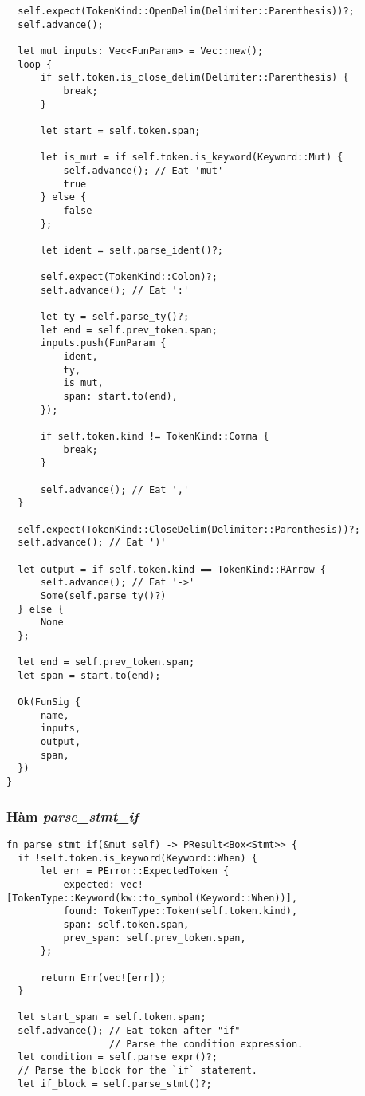 {\begin{lstlisting}
  self.expect(TokenKind::OpenDelim(Delimiter::Parenthesis))?;
  self.advance();

  let mut inputs: Vec<FunParam> = Vec::new();
  loop {
      if self.token.is_close_delim(Delimiter::Parenthesis) {
          break;
      }

      let start = self.token.span;

      let is_mut = if self.token.is_keyword(Keyword::Mut) {
          self.advance(); // Eat 'mut'
          true
      } else {
          false
      };

      let ident = self.parse_ident()?;

      self.expect(TokenKind::Colon)?;
      self.advance(); // Eat ':'

      let ty = self.parse_ty()?;
      let end = self.prev_token.span;
      inputs.push(FunParam {
          ident,
          ty,
          is_mut,
          span: start.to(end),
      });

      if self.token.kind != TokenKind::Comma {
          break;
      }

      self.advance(); // Eat ','
  }

  self.expect(TokenKind::CloseDelim(Delimiter::Parenthesis))?;
  self.advance(); // Eat ')'

  let output = if self.token.kind == TokenKind::RArrow {
      self.advance(); // Eat '->'
      Some(self.parse_ty()?)
  } else {
      None
  };

  let end = self.prev_token.span;
  let span = start.to(end);

  Ok(FunSig {
      name,
      inputs,
      output,
      span,
  })
}
\end{lstlisting}

\subsubsection{Hàm \textit{parse\_stmt\_if}}
\label{ap1:stmt_when}
\begin{lstlisting}
fn parse_stmt_if(&mut self) -> PResult<Box<Stmt>> {
  if !self.token.is_keyword(Keyword::When) {
      let err = PError::ExpectedToken {
          expected: vec![TokenType::Keyword(kw::to_symbol(Keyword::When))],
          found: TokenType::Token(self.token.kind),
          span: self.token.span,
          prev_span: self.prev_token.span,
      };

      return Err(vec![err]);
  }

  let start_span = self.token.span;
  self.advance(); // Eat token after "if"
                  // Parse the condition expression.
  let condition = self.parse_expr()?;
  // Parse the block for the `if` statement.
  let if_block = self.parse_stmt()?;


\end{lstlisting}}
